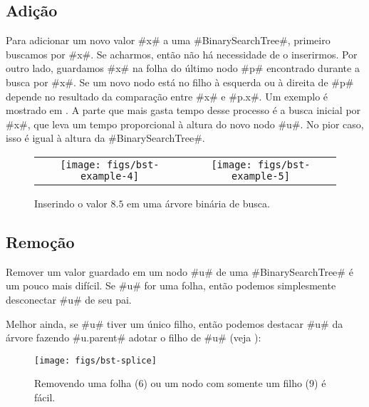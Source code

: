 \subsection{Adição}

Para adicionar um novo valor #x# a uma 
#BinarySearchTree#, primeiro buscamos por #x#. 
Se acharmos, então não há necessidade de o inserirmos. Por outro lado,
guardamos #x# na folha do último nodo #p# encontrado durante a busca
por #x#. Se um novo nodo está no filho à esquerda ou à direita de #p# depende
no resultado da comparação entre 
 #x# e #p.x#.
Um exemplo é mostrado em 
. A parte que mais gasta tempo desse processo é a busca inicial por #x#, que leva um tempo proporcional à altura do novo nodo #u#.
No pior caso, isso é igual à altura da #BinarySearchTree#.


\begin{figure}
  \begin{center}
    \begin{tabular}{cc}
    \texttt{[image: figs/bst-example-4]} &
    \texttt{[image: figs/bst-example-5]} 
    \end{tabular}
  \end{center}
  \caption{Inserindo o valor $8.5$ em uma árvore binária de busca.} 
\end{figure}


\subsection{Remoção}

Remover um valor guardado em um nodo #u# de uma
#BinarySearchTree# é um pouco mais difícil. 
Se #u# for uma folha, então podemos simplesmente desconectar #u# de seu pai.

Melhor ainda, se #u# tiver um único filho, então podemos destacar #u#
da árvore fazendo 
#u.parent# adotar o filho de #u# (veja
):

\begin{figure}
  \begin{center}
    \texttt{[image: figs/bst-splice]}
  \end{center}
  \caption{Removendo uma folha ($6$) ou um nodo com somente um filho ($9$) é fácil.}
\end{figure}

